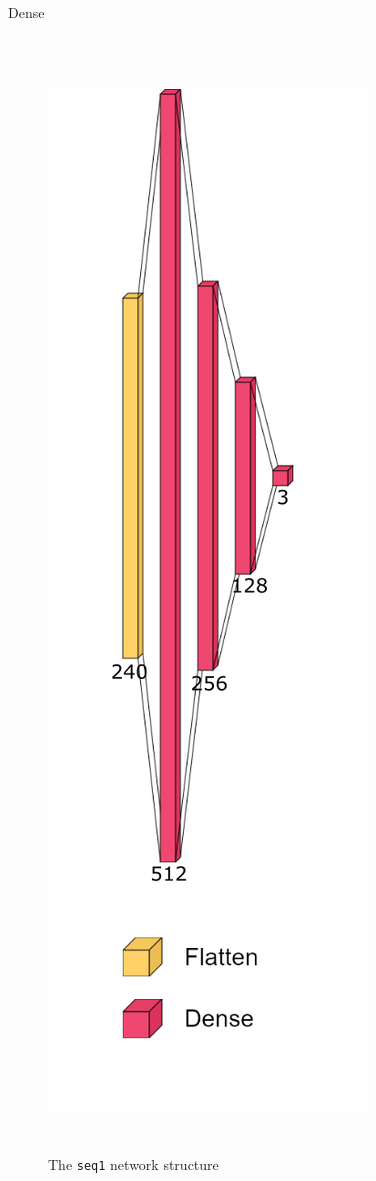 \documentclass[10pt, xcolor={dvipsnames}]{beamer}
\begin{document}
\begin{frame}{Dense}
    \begin{columns}
        \begin{figure}
            \centering
            \includegraphics[height=1.2\textwidth]{assets/nets/seq1.png}
            \caption*{The \alert{\texttt{seq1}} network structure}
        \end{figure}
        

\end{columns}
\end{frame}
\end{document}
